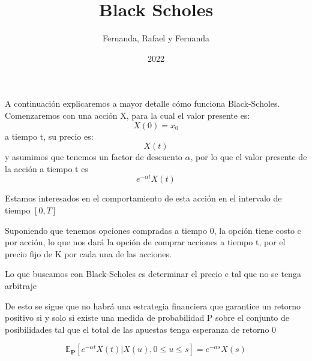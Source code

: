 \documentclass{beamer}
\title{Black Scholes}
\author{Fernanda, Rafael y Fernanda}
\institute{ITAM}
\date{2022}
\begin{document}
\frame{\titlepage}

\begin{frame}
A continuación explicaremos a mayor detalle cómo funciona Black-Scholes.
Comenzaremos con una acción X, para la cual el valor presente es:
\begin{equation*}
X(0) = x_{0}
\end{equation*}
a tiempo t, su precio es:
\begin{equation*}
X(t)
\end{equation*}
y asumimos que tenemos un factor de descuento $\alpha$, por lo que el valor presente de la acción a tiempo t es
\begin{equation*}
	e^{-\alpha t}X(t)
\end{equation*}
\end{frame}
\begin{frame}
	Estamos interesados en el comportamiento de esta acción en el intervalo de tiempo $[0,T]$\par
	Suponiendo que tenemos opciones compradas a tiempo 0, la opción tiene costo c por acción, lo que nos dará la opción de comprar acciones a tiempo t, por el precio fijo de K por cada una de las acciones.\par
	Lo que buscamos con Black-Scholes es determinar el precio c tal que no se tenga arbitraje
\end{frame}
\begin{frame}
	De esto se sigue que no habrá una estrategia financiera que garantice un retorno positivo si y solo si existe una medida de probabilidad P sobre el conjunto de posibilidades tal que el total de las apuestas tenga esperanza de retorno 0

\begin{equation} \label{eq:1}
\mathbb{E}_{\textbf{P}}[e^{-\alpha t} X(t) | X(u), 0 \leq u \leq s] = e^{-\alpha s} X(s)
\end{equation}
\end{frame}
\end{document}
